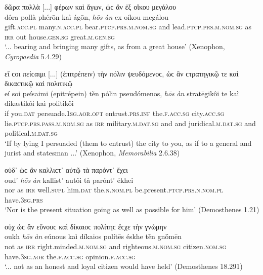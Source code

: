 \begin{exe}
\ex δῶρα πολλὰ {[}...{]} φέρων καὶ ἄγων, ὡϲ ἂν ἐξ οἴκου μεγάλου\\ 
\gll dôra pollà phérōn kaì ágōn, \emph{hōs} \emph{àn} ex oíkou megálou\\
gift.\textsc{acc.pl} many.\textsc{n.acc.pl} bear.\textsc{ptcp.prs.m.nom.sg} and lead.\textsc{ptcp.prs.m.nom.sg} as \textsc{irr} out house.\textsc{gen.sg} great.\textsc{m.gen.sg}\\
\trans `... bearing and bringing many gifts, as from a great house' (Xenophon, \textit{Cyropaedia} 5.4.29)
\label{hosan55}
\end{exe}

\begin{exe}
\ex εἴ ϲοι πείϲαιμι {[}...{]} (ἐπιτρέπειν) τὴν πόλιν ψευδόμενοϲ, ὡϲ ἂν ϲτρατηγικῷ τε καὶ δικαϲτικῷ καὶ πολιτικῷ\\
\gll eí soi peísaimi (epitrépein) tḕn pólin pseudómenos, \emph{hōs} \emph{àn} stratēgikôi te kaì dikastikôi kaì politikôi\\
if you.\textsc{dat} persuade.\textsc{1sg.aor.opt} entrust.\textsc{prs.inf} the.\textsc{f.acc.sg} city.\textsc{acc.sg} lie.\textsc{ptcp.prs.pass.m.nom.sg} as \textsc{irr} military.\textsc{m.dat.sg} and and juridical.\textsc{m.dat.sg} and political.\textsc{m.dat.sg}\\
\trans `If by lying I persuaded (them to entrust) the city to you, as if to a general and jurist and statesman ...' (Xenophon, \textit{Memorabilia} 2.6.38)
\label{hosan56}
\end{exe}

\begin{exe}
\ex οὐδ᾽ ὡϲ ἂν καλλιϲτ᾽ αὐτῷ τὰ παρόντ᾽ ἔχει\\
\gll oud' \emph{hōs} \emph{àn} kallist' autôi tà parónt' ékhei\\
nor as \textsc{irr} well.\textsc{supl} him.\textsc{dat} the.\textsc{n.nom.pl} be.present.\textsc{ptcp.prs.n.nom.pl} have.\textsc{3sg.prs}\\
\trans `Nor is the present situation going as well as possible for him' (Demosthenes 1.21)
\label{hosan57}
\end{exe}

\begin{exe}
\ex οὐχ ὡϲ ἂν εὔνουϲ καὶ δίκαιοϲ πολίτηϲ ἔϲχε τὴν γνώμην\\
\gll oukh \emph{hōs} \emph{àn} eúnous kaì díkaios polítēs éskhe tḕn gnṓmēn\\
not as \textsc{irr} right.minded.\textsc{m.nom.sg} and righteous.\textsc{m.nom.sg} citizen.\textsc{nom.sg} have.\textsc{3sg.aor} the.\textsc{f.acc.sg} opinion.\textsc{f.acc.sg}\\
\trans `... not as an honest and loyal citizen would have held' (Demosthenes 18.291)
\label{hosan58}
\end{exe}

